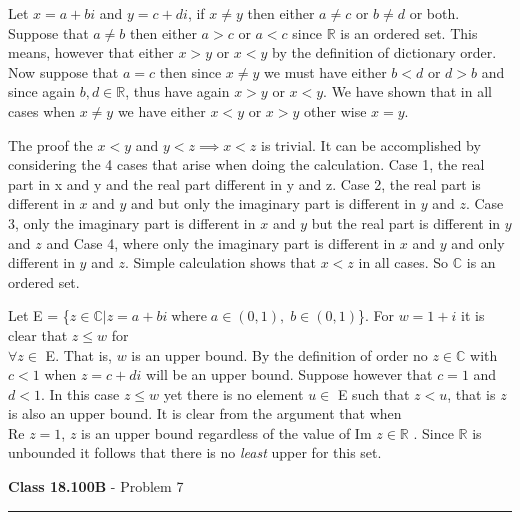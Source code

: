 \documentclass[11pt,reqno]{article}
\begin{document}
Let $x = a + bi$ and $y = c + di$, if $x \neq y$ then either $a \neq c$ or $b \neq d$ or both. Suppose that $a \neq b$ then either $a > c$ or $a < c$ since $\mathbb{R}$ is an ordered set. This means, however that either $x > y$ or $x < y$ by the definition of dictionary order. Now suppose that $a = c$ then since $x \neq y$ we must have either $b < d$ or $d > b$ and since again $b, d \in \mathbb{R}$, thus have again $x > y$ or $x < y$. We have shown that in all cases when $x \neq y$ we have either $x < y$ or $x > y$ other wise $x = y$.


The proof the $x < y$ and $y < z \implies x < z$ is trivial. It can be accomplished by considering the 4 cases that arise when doing the calculation. Case 1, the real part in x and y and the real part different in y and z. Case 2, the real part is different in $x$ and $y$ and but only the imaginary part is different in $y$ and $z$. Case 3, only the imaginary part is different in $x$ and $y$ but the real part is different in $y$ and $z$ and Case 4, where only the imaginary part is different in $x$ and $y$ and only different in $y$ and $z$. Simple calculation shows that $x < z$ in all cases. So $\mathbb{C}$ is an ordered set. 


Let E = \{$z \in \mathbb{C} | z = a + bi \; \text{where} \; a \in (0,1), \; b \in (0,1) $\}. For $w = 1 + i$ it is clear that $z \le w$ for \\$\forall z \in$ E. That is, $w$ is an upper bound. By the definition of order no $z \in \mathbb{C}$ with $c < 1$ when $z = c + di$ will be an upper bound. Suppose however that $c = 1$ and $d < 1$. In this case $z \le w$ yet there is no element $u \in$ E such that $z < u$, that is $z$ is also an upper bound. It is clear from the argument that when \\Re $z = 1$, $z$ is an upper bound regardless of the value of Im $z \in \mathbb{R}$ . Since $\mathbb{R}$ is unbounded it follows that there is no \textit{least} upper for this set.



\vspace{15pt}
\begin{flushleft} 
\textbf{Class 18.100B} - Problem 7\\
\rule{500pt}{1pt}\\
\end{flushleft} 
\end{document}
